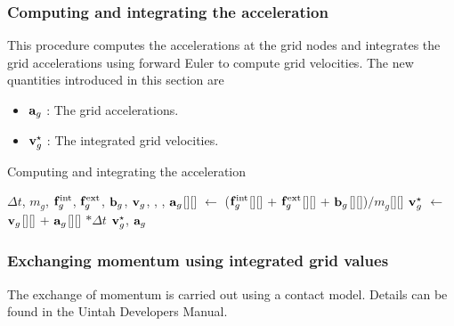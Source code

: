 \subsubsection{Computing and integrating the acceleration}
This procedure computes the accelerations at the grid nodes and integrates the grid accelerations
using forward Euler to compute grid velocities. The new quantities introduced in this section are
\begin{itemize} 
  \setlength\itemsep{1pt}
  \item $\mathbf{a}_{g}$ : {\Ochre The grid accelerations.}
  \item $\mathbf{v}_{g}^\star$ : {\Ochre The integrated grid velocities.}
\end{itemize}
\begin{breakablealgorithm}
  \caption{Computing and integrating the acceleration}
  \begin{algorithmic}[1]
    \Require $\Delta t$, $m_g$, $\mathbf{f}^{\text{int}}_g$, $\mathbf{f}^{\text{ext}}_g$, $\mathbf{b}_g$, $\mathbf{v}_g$,
             , ,
          \State $\mathbf{a}_g$[\TTmatl][\TTnode] $\leftarrow$ 
            ($\mathbf{f}^{\text{int}}_g$[\TTmatl][\TTnode] +
             $\mathbf{f}^{\text{ext}}_g$[\TTmatl][\TTnode] + 
             $\mathbf{b}_g$[\TTmatl][\TTnode])$/m_g$[\TTmatl][\TTnode]
          \State $\mathbf{v}_g^{\star}$ $\leftarrow$ $\mathbf{v}_g$[\TTmatl][\TTnode] + 
            $\mathbf{a}_g$[\TTmatl][\TTnode] $* \Delta t$
        \EndFor
      \EndFor
      \State \Return $\mathbf{v}_g^{\star}$, $\mathbf{a}_g$
    \EndProcedure
  \end{algorithmic}
\end{breakablealgorithm}

\subsubsection{Exchanging momentum using integrated grid values}
The exchange of momentum is carried out using a contact model.  Details can be found in the
Uintah Developers Manual.


